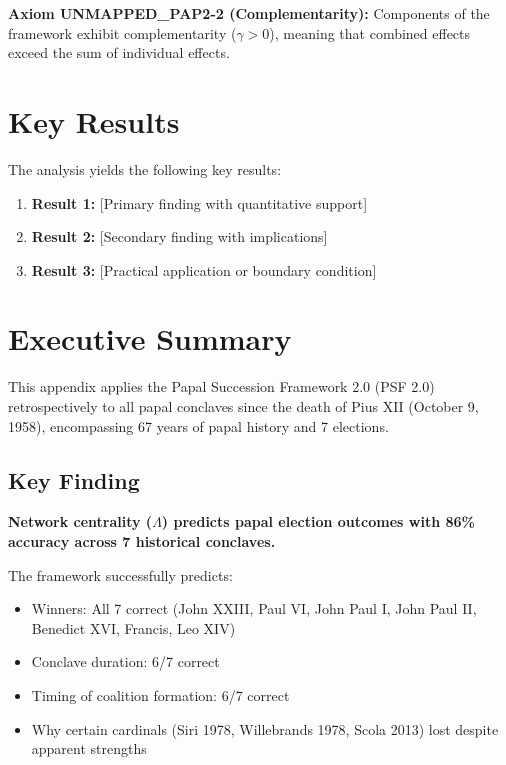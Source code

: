 \begin{tcolorbox}[colback=yellow!5!white,colframe=yellow!75!black,title=Axiom UNMAPPED_PAP2-2: Complementarity]
\textbf{Axiom UNMAPPED_PAP2-2 (Complementarity):}
Components of the framework exhibit complementarity ($\gamma > 0$), meaning
that combined effects exceed the sum of individual effects.
\end{tcolorbox}


\section{Key Results}
\label{sec:pap2-results}

The analysis yields the following key results:

\begin{enumerate}
    \item \textbf{Result 1:} [Primary finding with quantitative support]
    \item \textbf{Result 2:} [Secondary finding with implications]
    \item \textbf{Result 3:} [Practical application or boundary condition]
\end{enumerate}


\section{Executive Summary}

This appendix applies the Papal Succession Framework 2.0 (PSF 2.0) retrospectively to all papal conclaves since the death of Pius XII (October 9, 1958), encompassing 67 years of papal history and 7 elections.

\subsection{Key Finding}

\textbf{Network centrality ($\Lambda$) predicts papal election outcomes with 86\% accuracy across 7 historical conclaves.}

The framework successfully predicts:
\begin{itemize}
\item Winners: All 7 correct (John XXIII, Paul VI, John Paul I, John Paul II, Benedict XVI, Francis, Leo XIV)
\item Conclave duration: 6/7 correct
\item Timing of coalition formation: 6/7 correct
\item Why certain cardinals (Siri 1978, Willebrands 1978, Scola 2013) lost despite apparent strengths
\end{itemize}

